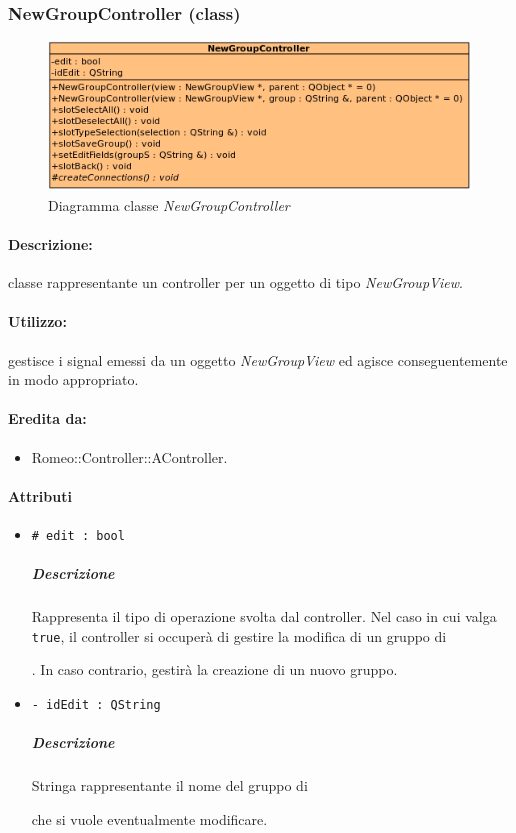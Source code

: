 	\subsubsection{NewGroupController (class)}
	\begin{figure}[!h]
		\centering
		\includegraphics[width=0.7\linewidth]{./Content/Immagini/controller/NewGroupController}
		\caption{Diagramma classe \textsl{NewGroupController}}
	\end{figure}
	\paragraph{Descrizione:} classe rappresentante un controller per un oggetto di tipo \textsl{NewGroupView}.
	\paragraph{Utilizzo:} gestisce i signal\g{} emessi da un oggetto \textsl{NewGroupView} ed agisce conseguentemente in modo appropriato.
	\paragraph{Eredita da:}
		\begin{itemize}
			\item Romeo::Controller::AController.
		\end{itemize}
	\paragraph{Attributi}
		\begin{itemize}
			\item \color{teal} \verb!# edit : bool!
			\color{black}
			\subparagraph{Descrizione} Rappresenta il tipo di operazione svolta dal controller. Nel caso in cui valga \verb!true!, il controller si occuperà di gestire la modifica di un gruppo di \subject{}. In caso contrario, gestirà la creazione di un nuovo gruppo.
			\item \color{teal} \verb!- idEdit : QString!
			\color{black}
			\subparagraph{Descrizione} Stringa rappresentante il nome del gruppo di \subject{} che si vuole eventualmente modificare.
		\end{itemize}
